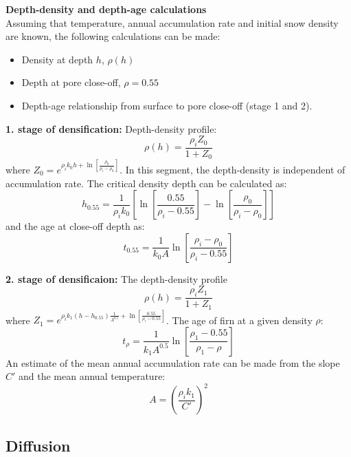 \documentclass[../../CompleteThesis/Complete_1stDraft.tex]{subfiles}
\begin{document}
\textbf{Depth-density and depth-age calculations}\\
Assuming that temperature, annual accumulation rate and initial snow density are known, the following calculations can be made:
\begin{itemize}
	\item Density at depth $h$, $\rho(h)$
	\item Depth at pore close-off, $\rho=0.55$
	\item Depth-age relationship from surface to pore close-off (stage 1 and 2).
\end{itemize}
\textbf{1. stage of densification:}
Depth-density profile:
\begin{equation}
	\rho(h) = \frac{\rho_i Z_0}{1 + Z_0}
\end{equation}
where $Z_0 = e^{\rho_i k_0 h + \ln\left[\frac{\rho_0}{\rho_i - \rho_0}\right]}$. In this segment, the depth-density is independent of accumulation rate. The critical density depth can be calculated as:
\begin{equation}
	h_{0.55} = \frac{1}{\rho_i k_0}\left[\ln\left[\frac{0.55}{\rho_i - 0.55}\right] - \ln\left[\frac{\rho_0}{\rho_i - \rho_0}\right]\right]
\end{equation}
and the age at close-off depth as:
\begin{equation}
	t_{0.55} = \frac{1}{k_0 A}\ln\left[\frac{\rho_i - \rho_0}{\rho_i - 0.55}\right]
\end{equation}

\textbf{2. stage of densificaion:} The depth-density profile
\begin{equation}
	\rho(h) = \frac{\rho_i Z_1}{1 + Z_1}
\end{equation}
where $Z_1 = e^{\rho_i k_1 (h - h_{0.55})\frac{1}{A^{0.5}} + \ln\left[\frac{0.55}{\rho_i - 0.55}\right]}$. The age of firn at a given density $\rho$:
\begin{equation}
	t_{\rho} = \frac{1}{k_1 A^{0.5}}\ln\left[\frac{\rho_1 - 0.55}{\rho_1 - \rho}\right]
\end{equation}
An estimate of the mean annual accumulation rate can be made from the slope $C'$ and the mean annual temperature:
\begin{equation}
	A = \left(\frac{\rho_i k_1}{C'}\right)^2
\end{equation}

\subsection{Diffusion}
\end{document}
